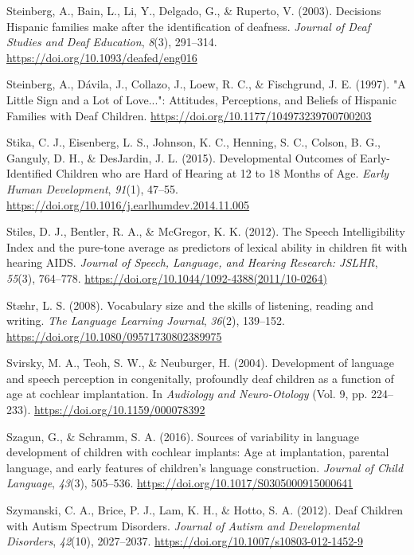 \documentclass[english,man]{apa6}
\begin{document}
\leavevmode\hypertarget{ref-steinberg2003}{}%
Steinberg, A., Bain, L., Li, Y., Delgado, G., \& Ruperto, V. (2003). Decisions Hispanic families make after the identification of deafness. \emph{Journal of Deaf Studies and Deaf Education}, \emph{8}(3), 291--314. \url{https://doi.org/10.1093/deafed/eng016}

\leavevmode\hypertarget{ref-steinberg1997}{}%
Steinberg, A., Dávila, J., Collazo, J., Loew, R. C., \& Fischgrund, J. E. (1997). "A Little Sign and a Lot of Love...": Attitudes, Perceptions, and Beliefs of Hispanic Families with Deaf Children. \url{https://doi.org/10.1177/104973239700700203}

\leavevmode\hypertarget{ref-stika2015}{}%
Stika, C. J., Eisenberg, L. S., Johnson, K. C., Henning, S. C., Colson, B. G., Ganguly, D. H., \& DesJardin, J. L. (2015). Developmental Outcomes of Early-Identified Children who are Hard of Hearing at 12 to 18 Months of Age. \emph{Early Human Development}, \emph{91}(1), 47--55. \url{https://doi.org/10.1016/j.earlhumdev.2014.11.005}

\leavevmode\hypertarget{ref-stiles2012}{}%
Stiles, D. J., Bentler, R. A., \& McGregor, K. K. (2012). The Speech Intelligibility Index and the pure-tone average as predictors of lexical ability in children fit with hearing AIDS. \emph{Journal of Speech, Language, and Hearing Research: JSLHR}, \emph{55}(3), 764--778. \url{https://doi.org/10.1044/1092-4388(2011/10-0264)}

\leavevmode\hypertarget{ref-staehr2008}{}%
Stæhr, L. S. (2008). Vocabulary size and the skills of listening, reading and writing. \emph{The Language Learning Journal}, \emph{36}(2), 139--152. \url{https://doi.org/10.1080/09571730802389975}

\leavevmode\hypertarget{ref-svirsky2004}{}%
Svirsky, M. A., Teoh, S. W., \& Neuburger, H. (2004). Development of language and speech perception in congenitally, profoundly deaf children as a function of age at cochlear implantation. In \emph{Audiology and Neuro-Otology} (Vol. 9, pp. 224--233). \url{https://doi.org/10.1159/000078392}

\leavevmode\hypertarget{ref-szagun2016}{}%
Szagun, G., \& Schramm, S. A. (2016). Sources of variability in language development of children with cochlear implants: Age at implantation, parental language, and early features of children's language construction. \emph{Journal of Child Language}, \emph{43}(3), 505--536. \url{https://doi.org/10.1017/S0305000915000641}

\leavevmode\hypertarget{ref-szymanski2012}{}%
Szymanski, C. A., Brice, P. J., Lam, K. H., \& Hotto, S. A. (2012). Deaf Children with Autism Spectrum Disorders. \emph{Journal of Autism and Developmental Disorders}, \emph{42}(10), 2027--2037. \url{https://doi.org/10.1007/s10803-012-1452-9}
\end{document}
